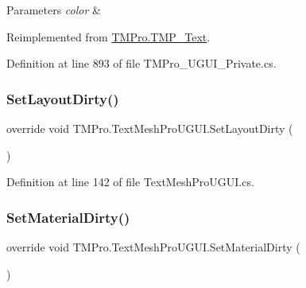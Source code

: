 \begin{DoxyParams}{Parameters}
{\em color} & \\
\hline
\end{DoxyParams}


Reimplemented from \mbox{\hyperlink{class_t_m_pro_1_1_t_m_p___text_a7737931333692ee9f01dd1e94cf68a45}{T\+M\+Pro.\+T\+M\+P\+\_\+\+Text}}.



Definition at line 893 of file T\+M\+Pro\+\_\+\+U\+G\+U\+I\+\_\+\+Private.\+cs.

\mbox{\label{class_t_m_pro_1_1_text_mesh_pro_u_g_u_i_a662b65a09b65317f716297d4377e27a7}} 
\subsubsection{\texorpdfstring{SetLayoutDirty()}{SetLayoutDirty()}}
{\footnotesize\ttfamily override void T\+M\+Pro.\+Text\+Mesh\+Pro\+U\+G\+U\+I.\+Set\+Layout\+Dirty (\begin{DoxyParamCaption}{ }\end{DoxyParamCaption})}







Definition at line 142 of file Text\+Mesh\+Pro\+U\+G\+U\+I.\+cs.

\mbox{\label{class_t_m_pro_1_1_text_mesh_pro_u_g_u_i_af75e3f762ed8c445cc4ad100903b5cf1}} 
\subsubsection{\texorpdfstring{SetMaterialDirty()}{SetMaterialDirty()}}
{\footnotesize\ttfamily override void T\+M\+Pro.\+Text\+Mesh\+Pro\+U\+G\+U\+I.\+Set\+Material\+Dirty (\begin{DoxyParamCaption}{ }\end{DoxyParamCaption})}







